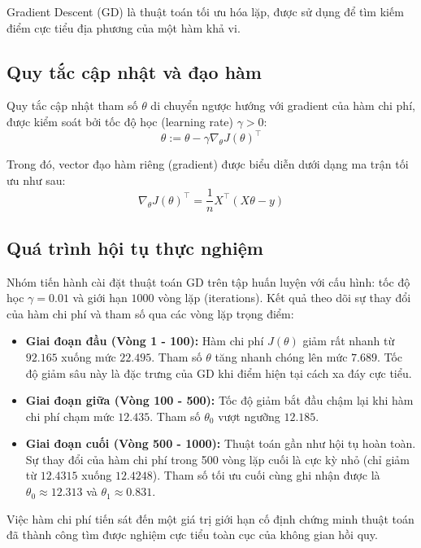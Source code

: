 Gradient Descent (GD) là thuật toán tối ưu hóa lặp, được sử dụng để tìm kiếm điểm cực tiểu địa phương của một hàm khả vi.

\subsection{Quy tắc cập nhật và đạo hàm}
Quy tắc cập nhật tham số $\theta$ di chuyển ngược hướng với gradient của hàm chi phí, được kiểm soát bởi tốc độ học (learning rate) $\gamma > 0$:
\begin{equation}
    \theta := \theta - \gamma \nabla_{\theta}J(\theta)^\top
\end{equation}

Trong đó, vector đạo hàm riêng (gradient) được biểu diễn dưới dạng ma trận tối ưu như sau:
\begin{equation}
    \nabla_{\theta}J(\theta)^\top = \frac{1}{n}X^\top(X\theta - y)
\end{equation}

\subsection{Quá trình hội tụ thực nghiệm}
Nhóm tiến hành cài đặt thuật toán GD trên tập huấn luyện với cấu hình: tốc độ học $\gamma = 0.01$ và giới hạn $1000$ vòng lặp (iterations). Kết quả theo dõi sự thay đổi của hàm chi phí và tham số qua các vòng lặp trọng điểm:
\begin{itemize}
    \item \textbf{Giai đoạn đầu (Vòng 1 - 100):} Hàm chi phí $J(\theta)$ giảm rất nhanh từ $92.165$ xuống mức $22.495$. Tham số $\theta$ tăng nhanh chóng lên mức $7.689$. Tốc độ giảm sâu này là đặc trưng của GD khi điểm hiện tại cách xa đáy cực tiểu.
    \item \textbf{Giai đoạn giữa (Vòng 100 - 500):} Tốc độ giảm bắt đầu chậm lại khi hàm chi phí chạm mức $12.435$. Tham số $\theta_0$ vượt ngưỡng $12.185$.
    \item \textbf{Giai đoạn cuối (Vòng 500 - 1000):} Thuật toán gần như hội tụ hoàn toàn. Sự thay đổi của hàm chi phí trong 500 vòng lặp cuối là cực kỳ nhỏ (chỉ giảm từ $12.4315$ xuống $12.4248$). Tham số tối ưu cuối cùng ghi nhận được là $\theta_0 \approx 12.313$ và $\theta_1 \approx 0.831$.
\end{itemize}

Việc hàm chi phí tiến sát đến một giá trị giới hạn cố định chứng minh thuật toán đã thành công tìm được nghiệm cực tiểu toàn cục của không gian hồi quy.
